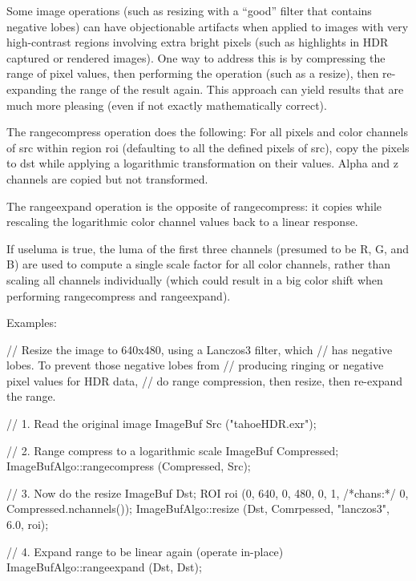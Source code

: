  
 

Some image operations (such as resizing with a ``good'' filter that
contains negative lobes) can have objectionable artifacts when applied
to images with very high-contrast regions involving extra bright pixels
(such as highlights in HDR captured or rendered images).  One way to
address this is by compressing the range of pixel values, then
performing the operation (such as a resize), then re-expanding the range
of the result again.  This approach can yield results that are much more
pleasing (even if not exactly mathematically correct).

The {\cf rangecompress} operation does the following: For all pixels and
color channels of {\cf src} within region {\cf roi} (defaulting to all
the defined pixels of {\cf src}), copy the pixels to {\cf dst}
while applying a logarithmic transformation on
their values.  Alpha and z channels are copied but not transformed.

The {\cf rangeexpand} operation is the opposite of {\cf rangecompress}: it
copies while rescaling the logarithmic color channel values back to a linear
response.

If {\cf useluma} is true, the luma of the first three channels (presumed
to be R, G, and B) are used to compute a single scale factor for all
color channels, rather than scaling all channels individually (which
could result in a big color shift when performing {\cf rangecompress}
and {\cf rangeexpand}).

\smallskip
\noindent Examples:
\begin{code}
    // Resize the image to 640x480, using a Lanczos3 filter, which
    // has negative lobes. To prevent those negative lobes from
    // producing ringing or negative pixel values for HDR data,
    // do range compression, then resize, then re-expand the range.

    // 1. Read the original image
    ImageBuf Src ("tahoeHDR.exr");

    // 2. Range compress to a logarithmic scale
    ImageBuf Compressed;
    ImageBufAlgo::rangecompress (Compressed, Src);

    // 3. Now do the resize
    ImageBuf Dst;
    ROI roi (0, 640, 0, 480, 0, 1, /*chans:*/ 0, Compressed.nchannels());
    ImageBufAlgo::resize (Dst, Comrpessed, "lanczos3", 6.0, roi);

    // 4. Expand range to be linear again (operate in-place)
    ImageBufAlgo::rangeexpand (Dst, Dst);
\end{code}
\apiend


